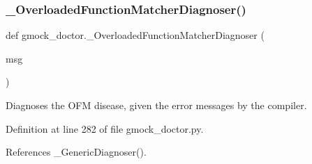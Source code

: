\subsubsection{\texorpdfstring{\+\_\+\+Overloaded\+Function\+Matcher\+Diagnoser()}{\_OverloadedFunctionMatcherDiagnoser()}}
{\footnotesize\ttfamily def gmock\+\_\+doctor.\+\_\+\+Overloaded\+Function\+Matcher\+Diagnoser (\begin{DoxyParamCaption}\item[{}]{msg }\end{DoxyParamCaption})\hspace{0.3cm}{\ttfamily [private]}}

\begin{DoxyVerb}Diagnoses the OFM disease, given the error messages by the compiler.\end{DoxyVerb}
 

Definition at line 282 of file gmock\+\_\+doctor.\+py.



References \+\_\+\+Generic\+Diagnoser().


